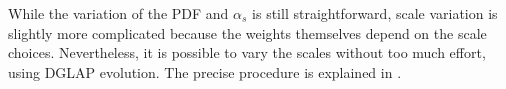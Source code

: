 While the variation of the PDF and $\alpha_s$ is still straightforward, scale variation is slightly more complicated because the weights themselves depend on the scale choices.
Nevertheless, it is possible to vary the scales without too much effort, using DGLAP evolution.
The precise procedure is explained in \cite{applgrid2010}.
